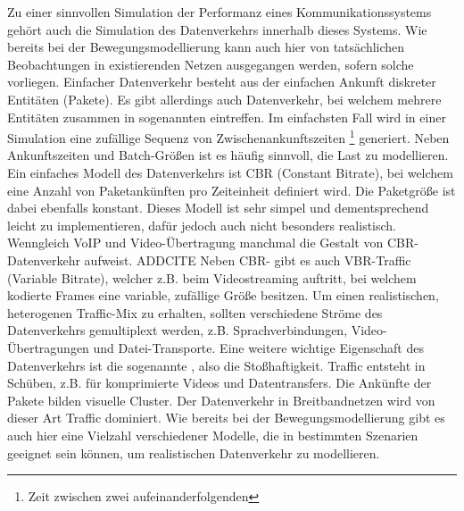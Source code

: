 \documentclass[12pt, a4paper]{article}
\begin{document}
Zu einer sinnvollen Simulation der Performanz eines Kommunikationssystems gehört auch die Simulation des Datenverkehrs
innerhalb dieses Systems. Wie bereits bei der Bewegungsmodellierung kann auch hier von tatsächlichen Beobachtungen in
existierenden Netzen ausgegangen werden, sofern solche vorliegen.
\newline\newline
Einfacher Datenverkehr besteht aus der einfachen Ankunft diskreter Entitäten (Pakete).
Es gibt allerdings auch Datenverkehr, bei welchem mehrere Entitäten zusammen in sogenannten  eintreffen.
Im einfachsten Fall wird in einer Simulation eine zufällige Sequenz von Zwischenankunftszeiten \footnote{Zeit zwischen zwei 
aufeinanderfolgenden } generiert.
Neben Ankunftszeiten und Batch-Größen ist es häufig sinnvoll, die Last zu modellieren. \cite{Frost1994}
\newline\newline
Ein einfaches Modell des Datenverkehrs ist \textsc{CBR} (Constant Bitrate), bei welchem eine Anzahl von Paketankünften
pro Zeiteinheit definiert wird. Die Paketgröße ist dabei ebenfalls konstant. Dieses Modell ist sehr simpel und dementsprechend
leicht zu implementieren, dafür jedoch auch nicht besonders realistisch. Wenngleich VoIP und Video-Übertragung manchmal
die Gestalt von \textsc{CBR}-Datenverkehr aufweist. ADDCITE\newline
Neben \textsc{CBR}- gibt es auch \textsc{VBR}-Traffic (Variable Bitrate), welcher z.B. beim Videostreaming auftritt,
bei welchem kodierte Frames eine variable, zufällige Größe besitzen.\cite{Frost1994}
\newline\newline
Um einen realistischen, heterogenen Traffic-Mix zu erhalten, sollten verschiedene Ströme des Datenverkehrs
gemultiplext werden, z.B. Sprachverbindungen, Video-Übertragungen und Datei-Transporte. \cite{Frost1994}
\newline\newline
Eine weitere wichtige Eigenschaft des Datenverkehrs ist die sogenannte , also die Stoßhaftigkeit.
Traffic entsteht in Schüben, z.B. für komprimierte Videos und Datentransfers. Die Ankünfte der Pakete bilden visuelle
Cluster. Der Datenverkehr in Breitbandnetzen wird von dieser Art Traffic dominiert. \cite{Frost1994}
\newline\newline
Wie bereits bei der Bewegungsmodellierung gibt es auch hier eine Vielzahl verschiedener Modelle, die in bestimmten Szenarien
geeignet sein können, um realistischen Datenverkehr zu modellieren.
\end{document}
